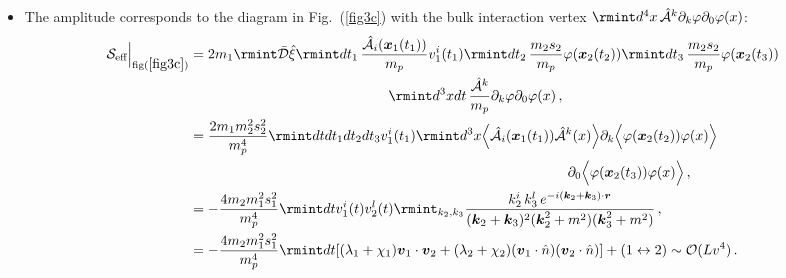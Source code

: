 \begin{itemize}
\begin{align}
\end{align}
Again, all the details of the integrals are given in Appendix~(\ref{ch1:app:B}). The functions $\lambda_{1,2},\chi_{1,2}$ are defined in  (\ref{B.5m}) of Appendix~(\ref{ch1:app:B}).
\item The amplitude corresponds to the diagram in Fig.~(\ref{fig3c}) with the bulk interaction vertex $\rmint d^4x\,\Hat{\mathcal{A}}^{k}\partial_{k}\varphi\partial_{0}\varphi(x)$:
\begin{align}
    \begin{split}
          \mathcal{S}_{\text{eff}}\Big|_{\text{fig}(\ref{fig3c})}&=2m_1\rmint\Bar{\mathcal{D}}\Hat{\xi}\rmint dt_1\, \frac{\Hat{\mathcal{A}}_{i}(\boldsymbol{x}_1(t_1))}{m_{p}}v_1^{i}(t_1)\rmint dt_2\,\frac{m_2 s_2}{m_p}\varphi(\boldsymbol{x}_2(t_2))\rmint dt_3\,\frac{m_2 s_2}{m_p}\varphi(\boldsymbol{x}_2(t_3))\\&\hspace{5cm}\rmint d^3x dt \,\frac{\Hat{\mathcal{A}}^{k}}{m_p}\partial_{k}\varphi\partial_{0}\varphi(x)\,,\\ &
        =\frac{2m_1 m_2^2 s_2^2}{m_p^4}\rmint dt dt_1 dt_2 dt_3 v_1^i(t_1)\rmint d^3x \Big\langle\Hat{\mathcal{A}}_{i}(\boldsymbol{x}_1(t_1))\mathcal{\Hat{A}}^{k}(x)\Big\rangle \partial_{k}\Big\langle\varphi(\boldsymbol{x}_2(t_2))\varphi(x)\Big\rangle \\&\hspace{9.5cm}\partial_{0}\Big\langle\varphi(\boldsymbol{x}_2(t_3))\varphi(x  )\Big\rangle\,,\\ &
        =-\frac{4m_2 m_1^2 s_1^2}{m_p^4}\rmint dt v_1^i(t)v_2^{l}(t)\rmint_{k_2,k_3}\frac{k_2^i\,k_3^l\,e^{-i(\boldsymbol{k}_2+\boldsymbol{k}_3)\cdot \boldsymbol{r}}}{(\boldsymbol{k}_2+\boldsymbol{k}_3)^2(\boldsymbol{k}_2^2+m^2)(\boldsymbol{k}_3^2+m^2)}\,,\\ &
        =-\frac{4m_2 m_1^2s_1^2}{m_p^4}\rmint dt[(\lambda_1+\chi_1)\boldsymbol{v}_1\cdot\boldsymbol{v}_2+(\lambda_2+\chi_2)(\boldsymbol{v}_1\cdot \Hat{n})(\boldsymbol{v}_2\cdot \Hat{n})]+(1\leftrightarrow 2)\sim \mathcal{O}(L v^4)\,.

\end{split}
\end{align}
\end{itemize}
